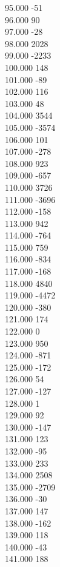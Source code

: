 { 95.000	-51 \\
 96.000	90 \\
 97.000	-28 \\
 98.000	2028 \\
 99.000	-2233 \\
 100.000	148 \\
 101.000	-89 \\
 102.000	116 \\
 103.000	48 \\
 104.000	3544 \\
 105.000	-3574 \\
 106.000	101 \\
 107.000	-278 \\
 108.000	923 \\
 109.000	-657 \\
 110.000	3726 \\
 111.000	-3696 \\
 112.000	-158 \\
 113.000	942 \\
 114.000	-764 \\
 115.000	759 \\
 116.000	-834 \\
 117.000	-168 \\
 118.000	4840 \\
 119.000	-4472 \\
 120.000	-380 \\
 121.000	174 \\
 122.000	0 \\
 123.000	950 \\
 124.000	-871 \\
 125.000	-172 \\
 126.000	54 \\
 127.000	-127 \\
 128.000	1 \\
 129.000	92 \\
 130.000	-147 \\
 131.000	123 \\
 132.000	-95 \\
 133.000	233 \\
 134.000	2508 \\
 135.000	-2709 \\
 136.000	-30 \\
 137.000	147 \\
 138.000	-162 \\
 139.000	118 \\
 140.000	-43 \\
 141.000	188 \\
}

